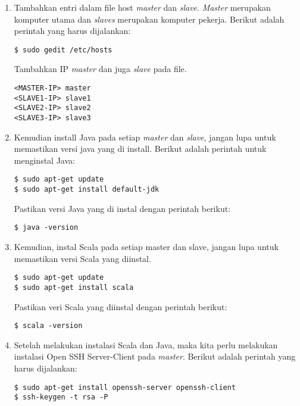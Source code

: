 \begin{enumerate}

\item Tambahkan entri dalam file host \textit{master} dan \textit{slave}. \textit{Master} merupakan komputer utama dan \textit{slaves} merupakan komputer pekerja. Berikut adalah perintah yang harus dijalankan: 

\begin{verbatim}
$ sudo gedit /etc/hosts
\end{verbatim}

Tambahkan IP \textit{master} dan juga \textit{slave} pada file.

\begin{verbatim}
<MASTER-IP> master
<SLAVE1-IP> slave1
<SLAVE2-IP> slave2
<SLAVE3-IP> slave3
\end{verbatim}

\item Kemudian install Java pada setiap \textit{master} dan \textit{slave}, jangan lupa untuk memastikan versi java yang di install. Berikut adalah perintah untuk menginstal Java:

\begin{verbatim}
$ sudo apt-get update
$ sudo apt-get install default-jdk
\end{verbatim}

Pastikan versi Java yang di instal dengan perintah berikut:

\begin{verbatim}
$ java -version
\end{verbatim}

\item Kemudian, instal Scala pada setiap master dan slave, jangan lupa untuk memastikan versi Scala yang diinstal.

\begin{verbatim}
$ sudo apt-get update
$ sudo apt-get install scala
\end{verbatim}

Pastikan veri Scala yang diinstal dengan perintah berikut:

\begin{verbatim}
$ scala -version
\end{verbatim}

\item Setelah melakukan instalasi Scala dan Java, maka kita perlu melakukan instalasi Open SSH Server-Client pada \textit{master}. Berikut adalah perintah yang harus dijalankan:

\begin{verbatim}
$ sudo apt-get install openssh-server openssh-client
$ ssh-keygen -t rsa -P 
\end{verbatim}


\end{enumerate}

